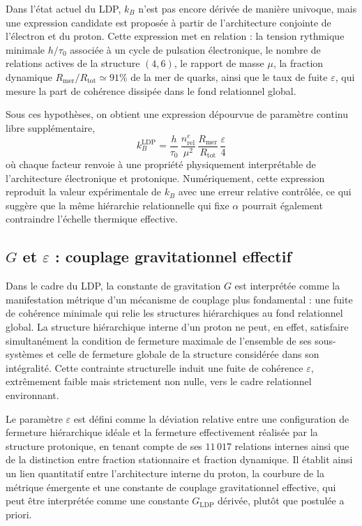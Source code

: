\documentclass[11pt,a4paper]{article}
\begin{document}
Dans l’état actuel du LDP, \(k_B\) n’est pas encore dérivée de manière univoque, mais une expression candidate est proposée à partir de l’architecture conjointe de l’électron et du proton. Cette expression met en relation : la tension rythmique minimale \(h/\tau_0\) associée à un cycle de pulsation électronique, le nombre de relations actives de la structure \(\left(4,6\right)\), le rapport de masse \(\mu\), la fraction dynamique \(R_{\mathrm{mer}}/R_{\mathrm{tot}} \simeq 91\%\) de la mer de quarks, ainsi que le taux de fuite \(\varepsilon\), qui mesure la part de cohérence dissipée dans le fond relationnel global.

Sous ces hypothèses, on obtient une expression dépourvue de paramètre continu libre supplémentaire,
\[
k_B^{\mathrm{LDP}}
= \frac{h}{\tau_0}\,
  \frac{n_{\mathrm{rel}}^{e}}{\mu^{2}}\,
  \frac{R_{\mathrm{mer}}}{R_{\mathrm{tot}}}\,
  \frac{\varepsilon}{4}
\]
où chaque facteur renvoie à une propriété physiquement interprétable de l’architecture électronique et protonique. Numériquement, cette expression reproduit la valeur expérimentale de \(k_B\) avec une erreur relative contrôlée, ce qui suggère que la même hiérarchie relationnelle qui fixe \(\alpha\) pourrait également contraindre l’échelle thermique effective.

\subsection{\texorpdfstring{\(G\)}{G} et \texorpdfstring{\(\varepsilon\)}{epsilon} : couplage gravitationnel effectif}

Dans le cadre du LDP, la constante de gravitation \(G\) est interprétée comme la manifestation métrique d’un mécanisme de couplage plus fondamental : une fuite de cohérence minimale qui relie les structures hiérarchiques au fond relationnel global. La structure hiérarchique interne d’un proton ne peut, en effet, satisfaire simultanément la condition de fermeture maximale de l’ensemble de ses sous-systèmes et celle de fermeture globale de la structure considérée dans son intégralité. Cette contrainte structurelle induit une fuite de cohérence \(\varepsilon\), extrêmement faible mais strictement non nulle, vers le cadre relationnel environnant. 

Le paramètre \(\varepsilon\) est défini comme la déviation relative entre une configuration de fermeture hiérarchique idéale et la fermeture effectivement réalisée par la structure protonique, en tenant compte de ses \(11\,017\) relations internes ainsi que de la distinction entre fraction stationnaire et fraction dynamique. Il établit ainsi un lien quantitatif entre l’architecture interne du proton, la courbure de la métrique émergente et une constante de couplage gravitationnel effective, qui peut être interprétée comme une constante \(G_{\mathrm{LDP}}\) dérivée, plutôt que postulée a priori. 
\end{document}
